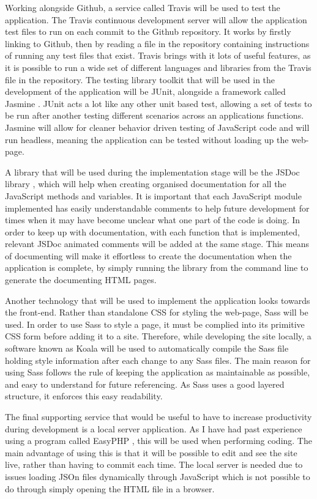 Working alongside Github, a service called Travis \cite{travis} will be used to test the application. The Travis continuous development server will allow the application test files to run on each commit to the Github repository. It works by firstly linking to Github, then by reading a file in the repository containing instructions of running any test files that exist. Travis brings with it lots of useful features, as it is possible to run a wide set of different languages and libraries from the Travis file in the repository. The testing library toolkit that will be used in the development of the application will be JUnit, alongside a framework called Jasmine \cite{jasmine}. JUnit acts a lot like any other unit based test, allowing a set of tests to be run after another testing different scenarios across an applications functions. Jasmine will allow for cleaner behavior driven testing of JavaScript code and will run headless, meaning the application can be tested without loading up the web-page.

A library that will be used during the implementation stage will be the JSDoc library \cite{jsdoc}, which will help when creating organised documentation for all the JavaScript methods and variables. It is important that each JavaScript module implemented has easily understandable comments to help future development for times when it may have become unclear what one part of the code is doing. In order to keep up with documentation, with each function that is implemented, relevant JSDoc animated comments will be added at the same stage. This means of documenting will make it effortless to create the documentation when the application is complete, by simply running the library from the command line to generate the documenting HTML pages.

Another technology that will be used to implement the application looks towards the front-end. Rather than standalone CSS for styling the web-page, Sass \cite{sass} will be used. In order to use Sass to style a page, it must be complied into its primitive CSS form before adding it to a site. Therefore, while developing the site locally, a software known as Koala \cite{koala} will be used to automatically compile the Sass file holding style information after each change to any Sass files. The main reason for using Sass follows the rule of keeping the application as maintainable as possible, and easy to understand for future referencing. As Sass uses a good layered structure, it enforces this easy readability.

The final supporting service that would be useful to have to increase productivity during development is a local server application. As I have had past experience using a program called EasyPHP \cite{easyphp}, this will be used when performing coding. The main advantage of using this is that it will be possible to edit and see the site live, rather than having to commit each time. The local server is needed due to issues loading JSOn files dynamically through JavaScript which is not possible to do through simply opening the HTML file in a browser.